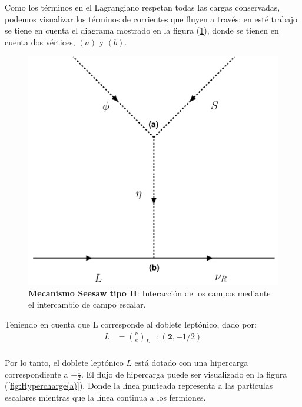\documentclass[12pt]{article}
\begin{document}
Como los términos en el Lagrangiano respetan todas las cargas conservadas, podemos visualizar los términos de corrientes que fluyen %
a través; en esté trabajo se tiene en cuenta el diagrama mostrado en la figura (\ref{fig:Majorana}),  donde se tienen en cuenta dos vértices, $(a)$ y $(b)$. \\

\begin{figure}[h!]
  \begin{center}
  \includegraphics[scale=0.6]{DiracSeeSAWdiagram.pdf}
\caption{{\textbf{Mecanismo Seesaw tipo II}: Interacción de los campos mediante el intercambio de campo escalar.}}
\label{fig:Majorana}
\end{center}
\end{figure}

Teniendo en cuenta que L corresponde al doblete leptónico, dado por:\\ 


\begin{equation}
\begin{aligned}
    \label{eq:DobleteL}
      L & = \binom{\nu}{e}_L & :  (\textbf{2}, -1/2)  
\end{aligned}
\end{equation}\\

Por lo tanto, el doblete leptónico $L$ está dotado con una hipercarga correspondiente a $-\frac{1}{2}$. El flujo de hipercarga puede ser visualizado en la figura (\ref{fig:Hypercharge(a)}). Donde la línea punteada representa a las partículas escalares mientras que la línea continua a los fermiones. 
\end{document}
